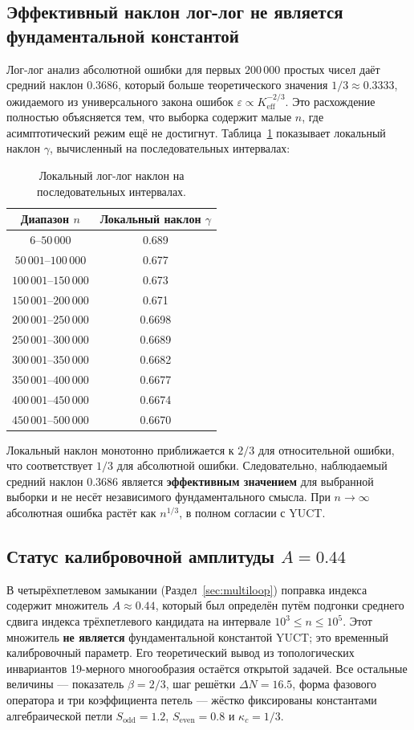 \documentclass[12pt,a4paper]{article}
\begin{document}
	\subsection{Эффективный наклон лог-лог не является фундаментальной константой}
	Лог-лог анализ абсолютной ошибки для первых \(200\,000\) простых чисел даёт средний наклон \(0.3686\), который больше теоретического значения \(1/3 \approx 0.3333\), ожидаемого из универсального закона ошибок \(\varepsilon \propto K_{\mathrm{eff}}^{-2/3}\). Это расхождение полностью объясняется тем, что выборка содержит малые \(n\), где асимптотический режим ещё не достигнут. Таблица~\ref{tab:local-slopes} показывает локальный наклон \(\gamma\), вычисленный на последовательных интервалах:
	\begin{table}[htbp]
		\centering
		\caption{Локальный лог-лог наклон на последовательных интервалах.}
		\label{tab:local-slopes}
		\begin{tabular}{c c}
			\toprule
			Диапазон \(n\) & Локальный наклон \(\gamma\) \\
			\midrule
			\(6\)--\(50\,000\)    & 0.689 \\
			\(50\,001\)--\(100\,000\) & 0.677 \\
			\(100\,001\)--\(150\,000\)& 0.673 \\
			\(150\,001\)--\(200\,000\)& 0.671 \\
			\(200\,001\)--\(250\,000\)& 0.6698 \\
			\(250\,001\)--\(300\,000\)& 0.6689 \\
			\(300\,001\)--\(350\,000\)& 0.6682 \\
			\(350\,001\)--\(400\,000\)& 0.6677 \\
			\(400\,001\)--\(450\,000\)& 0.6674 \\
			\(450\,001\)--\(500\,000\)& 0.6670 \\
			\bottomrule
		\end{tabular}
	\end{table}
	Локальный наклон монотонно приближается к \(2/3\) для относительной ошибки, что соответствует \(1/3\) для абсолютной ошибки. Следовательно, наблюдаемый средний наклон \(0.3686\) является \textbf{эффективным значением} для выбранной выборки и не несёт независимого фундаментального смысла. При \(n\to\infty\) абсолютная ошибка растёт как \(n^{1/3}\), в полном согласии с YUCT.
	
	\subsection{Статус калибровочной амплитуды \(A=0.44\)}
	В четырёхпетлевом замыкании (Раздел~\ref{sec:multiloop}) поправка индекса содержит множитель \(A \approx 0.44\), который был определён путём подгонки среднего сдвига индекса трёхпетлевого кандидата на интервале \(10^3\le n\le 10^5\). Этот множитель \textbf{не является} фундаментальной константой YUCT; это временный калибровочный параметр. Его теоретический вывод из топологических инвариантов 19-мерного многообразия остаётся открытой задачей. Все остальные величины — показатель \(\beta=2/3\), шаг решётки \(\Delta N=16.5\), форма фазового оператора и три коэффициента петель — жёстко фиксированы константами алгебраической петли \(S_{\mathrm{odd}}=1.2\), \(S_{\mathrm{even}}=0.8\) и \(\kappa_c=1/3\).
	
\end{document}
